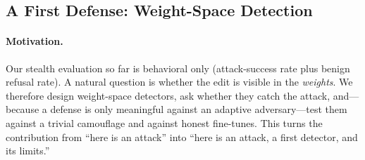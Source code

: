 \clearpage
\subsection{A First Defense: Weight-Space Detection}
\label{sec:defense}

\paragraph{Motivation.}
Our stealth evaluation so far is behavioral only (attack-success rate plus benign refusal rate). A
natural question is whether the edit is visible in the \emph{weights}. We therefore design
weight-space detectors, ask whether they catch the attack, and---because a defense is only meaningful
against an adaptive adversary---test them against a trivial camouflage and against honest fine-tunes.
This turns the contribution from ``here is an attack'' into ``here is an attack, a first detector, and
its limits.''

